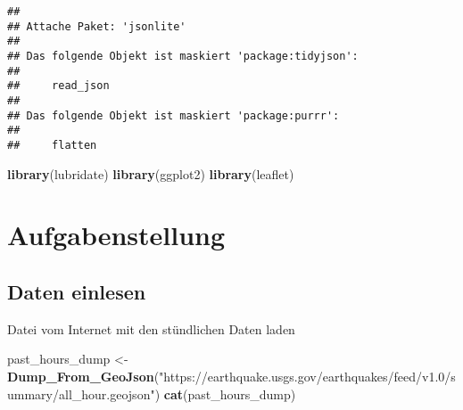 \documentclass[
]{article}
\newenvironment{Shaded}{\begin{snugshade}}{\end{snugshade}}
\newcommand{\FunctionTok}[1]{\textcolor[rgb]{0.13,0.29,0.53}{\textbf{#1}}}
\newcommand{\NormalTok}[1]{#1}
\newcommand{\OtherTok}[1]{\textcolor[rgb]{0.56,0.35,0.01}{#1}}
\newcommand{\StringTok}[1]{\textcolor[rgb]{0.31,0.60,0.02}{#1}}
\begin{document}
\begin{verbatim}
## 
## Attache Paket: 'jsonlite'
## 
## Das folgende Objekt ist maskiert 'package:tidyjson':
## 
##     read_json
## 
## Das folgende Objekt ist maskiert 'package:purrr':
## 
##     flatten
\end{verbatim}

\begin{Shaded}
\begin{Highlighting}[]
\FunctionTok{library}\NormalTok{(lubridate)}
\FunctionTok{library}\NormalTok{(ggplot2)}
\FunctionTok{library}\NormalTok{(leaflet)}
\end{Highlighting}
\end{Shaded}

\hypertarget{aufgabenstellung}{%
\section{Aufgabenstellung}\label{aufgabenstellung}}

\hypertarget{daten-einlesen}{%
\subsection{Daten einlesen}\label{daten-einlesen}}

Datei vom Internet mit den stündlichen Daten laden

\begin{Shaded}
\begin{Highlighting}[]
\NormalTok{past\_hours\_dump }\OtherTok{\textless{}{-}} \FunctionTok{Dump\_From\_GeoJson}\NormalTok{(}\StringTok{"https://earthquake.usgs.gov/earthquakes/feed/v1.0/summary/all\_hour.geojson"}\NormalTok{)}
\FunctionTok{cat}\NormalTok{(past\_hours\_dump)}
\end{Highlighting}
\end{Shaded}
\end{document}
